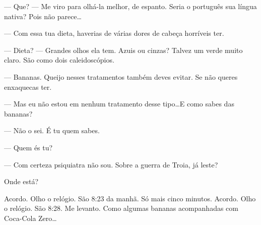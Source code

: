 --- Que? --- Me viro para olhá-la melhor, de espanto. Seria o português sua língua nativa? Pois não parece\ldots

--- Com essa tua dieta, haverias de várias dores de cabeça horríveis ter.

--- Dieta? --- Grandes olhos ela tem. Azuis ou cinzas? Talvez um verde muito claro. São como dois caleidoscópios.

--- Bananas. Queijo nesses tratamentos também deves evitar. Se não queres enxaquecas ter.

--- Mas eu não estou em nenhum tratamento desse tipo\ldots\linebreak E como sabes das bananas?

--- Não o sei. É tu quem sabes.

--- Quem és tu?

\begin{sloppypar}
--- Com certeza psiquiatra não sou. Sobre a guerra de Troia, já leste?
\end{sloppypar}

Onde está?

Acordo. Olho o relógio. São 8:23 da manhã. Só mais cinco minutos. Acordo. Olho o relógio. São 8:28. Me levanto. Como algumas bananas acompanhadas com Coca-Cola Zero\ldots
